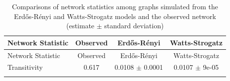 \documentclass[12pt,twoside]{amherstthesis}
\begin{document}
  \clearpage
  
  \begin{longtable}[]{@{}lccc@{}}
  \caption{Comparisons of network statistics among graphs simulated from
  the Erdős-Rényi and Watts-Strogatz models and the observed network
  (estimate \(\pm\) standard deviation)
  \label{tab:erwsdescstats}}\tabularnewline
  \toprule
  \begin{minipage}[b]{0.18\columnwidth}\raggedright\strut
  Network Statistic\strut
  \end{minipage} & \begin{minipage}[b]{0.13\columnwidth}\centering\strut
  Observed\strut
  \end{minipage} & \begin{minipage}[b]{0.29\columnwidth}\centering\strut
  Erdős-Rényi\strut
  \end{minipage} & \begin{minipage}[b]{0.29\columnwidth}\centering\strut
  Watts-Strogatz\strut
  \end{minipage}\tabularnewline
  \midrule
  \endfirsthead
  \toprule
  \begin{minipage}[b]{0.18\columnwidth}\raggedright\strut
  Network Statistic\strut
  \end{minipage} & \begin{minipage}[b]{0.13\columnwidth}\centering\strut
  Observed\strut
  \end{minipage} & \begin{minipage}[b]{0.29\columnwidth}\centering\strut
  Erdős-Rényi\strut
  \end{minipage} & \begin{minipage}[b]{0.29\columnwidth}\centering\strut
  Watts-Strogatz\strut
  \end{minipage}\tabularnewline
  \midrule
  \endhead
  \begin{minipage}[t]{0.18\columnwidth}\raggedright\strut
  Transitivity\strut
  \end{minipage} & \begin{minipage}[t]{0.13\columnwidth}\centering\strut
  0.617\strut
  \end{minipage} & \begin{minipage}[t]{0.29\columnwidth}\centering\strut
  0.0108 \(\pm\) 0.0001\strut
  \end{minipage} & \begin{minipage}[t]{0.29\columnwidth}\centering\strut
  0.0107 \(\pm\) 9e-05\strut
  \end{minipage}\tabularnewline
  \begin{minipage}[t]{0.18\columnwidth}\raggedright\strut

\end{minipage}
\end{longtable}
\end{document}
